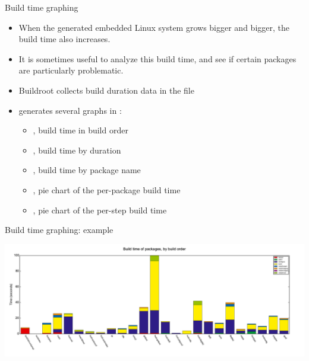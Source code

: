 \begin{frame}{Build time graphing}
  \begin{itemize}
  \item When the generated embedded Linux system grows bigger and
    bigger, the build time also increases.
  \item It is sometimes useful to analyze this build time, and see if
    certain packages are particularly problematic.
  \item Buildroot collects build duration data in the file
  \item {} generates several graphs in
    :
    \begin{itemize}
    \item {}, build time in build order
    \item {}, build time by duration
    \item {}, build time by package name
    \item {}, pie chart of the per-package
      build time
    \item {}, pie chart of the per-step build
      time
    \end{itemize}
  \end{itemize}
\end{frame}

\begin{frame}{Build time graphing: example}
  \begin{center}
    \includegraphics[width=\textwidth]{slides/buildroot-analysis/build-hist-build.pdf}
  \end{center}
\end{frame}

